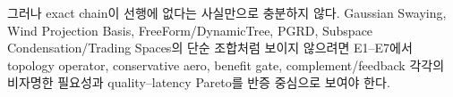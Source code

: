 \documentclass[11pt,a4paper]{article}
\begin{document}
그러나 exact chain이 선행에 없다는 사실만으로 충분하지 않다.
Gaussian Swaying, Wind Projection Basis, FreeForm/DynamicTree,
PGRD, Subspace Condensation/Trading Spaces의 단순 조합처럼 보이지 않으려면
E1--E7에서 topology operator, conservative aero,
benefit gate, complement/feedback 각각의 비자명한 필요성과
quality--latency Pareto를 반증 중심으로 보여야 한다.

\begingroup
\sloppy


\endgroup
\end{document}
